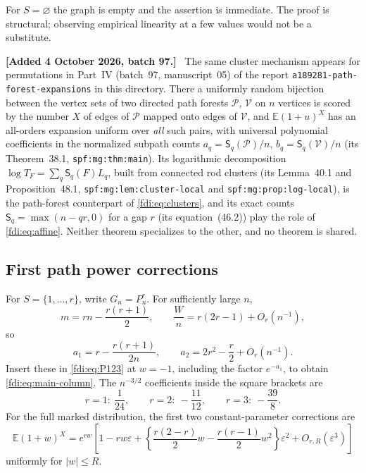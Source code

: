 \documentclass[11pt,letterpaper]{article}
\theoremstyle{remark}\newtheorem{remark}[theorem]{Remark}
\newcommand{\E}{\mathbb E}\newcommand{\Prb}{\mathbb P}\newcommand{\R}{\mathbb R}\newcommand{\C}{\mathbb C}
\newcommand{\eps}{\varepsilon}\newcommand{\Pois}{\operatorname{Poisson}}
\newenvironment{mergenote}[1][2 October 2026, batch 77]{\par\smallskip\begingroup\small\noindent\textbf{[Added #1.]}\ }{\endgroup\par\smallskip}
\begin{document}
For $S=\varnothing$ the graph is empty and the assertion is immediate. The proof is structural; observing empirical linearity at a few values would not be a substitute.
\begin{mergenote}[4 October 2026, batch 97]
The same cluster mechanism appears for permutations in Part~IV (batch~97, manuscript~05) of the report \texttt{a189281-\allowbreak path-\allowbreak forest-\allowbreak expansions} in this directory. There a uniformly random bijection between the vertex sets of two directed path forests $\mathcal P$, $\mathcal V$ on $n$ vertices is scored by the number $X$ of edges of $\mathcal P$ mapped onto edges of $\mathcal V$, and $\E(1+u)^X$ has an all-orders expansion uniform over \emph{all} such pairs, with universal polynomial coefficients in the normalized subpath counts $a_q=\mathsf S_q(\mathcal P)/n$, $b_q=\mathsf S_q(\mathcal V)/n$ (its Theorem~38.1, \texttt{spf:mg:thm:main}). Its logarithmic decomposition $\log T_F=\sum_q\mathsf S_q(F)L_q$, built from connected rod clusters (its Lemma~40.1 and Proposition~48.1, \texttt{spf:mg:lem:cluster-local} and \texttt{spf:mg:prop:log-local}), is the path-forest counterpart of \eqref{fdi:eq:clusters}, and its exact counts $\mathsf S_q=\max(n-qr,0)$ for a gap $r$ (its equation~(46.2)) play the role of \eqref{fdi:eq:affine}. Neither theorem specializes to the other, and no theorem is shared.
\end{mergenote}

\subsection{First path power corrections}\label{fdi:sec:pathpower}
For $S=\{1,\ldots,r\}$, write $G_n=P_n^r$. For sufficiently large $n$,
\[
 m=rn-\frac{r(r+1)}2,\qquad
 \frac Wn=r(2r-1)+O_r(n^{-1}),
\]
so
\[
 a_1=r-\frac{r(r+1)}{2n},\qquad
 a_2=2r^2-\frac r2+O_r(n^{-1}).
\]
Insert these in \eqref{fdi:eq:P123} at $w=-1$, including the factor $e^{-a_1}$, to obtain \eqref{fdi:eq:main-column}. The $n^{-3/2}$ coefficients inside the square brackets are
\[
 r=1:\ \frac1{24},\qquad r=2:\ -\frac{11}{12},\qquad
 r=3:\ -\frac{39}{8}.
\]
For the full marked distribution, the first two constant-parameter corrections are
\begin{equation}\label{fdi:eq:fixedpgf}
 \E(1+w)^X=e^{rw}\left[1-rw\eps+
 \left\{\frac{r(2-r)}2w-\frac{r(r-1)}2w^2\right\}\eps^2
 +O_{r,R}(\eps^3)\right]
\end{equation}
uniformly for $|w|\le R$.
\end{document}
